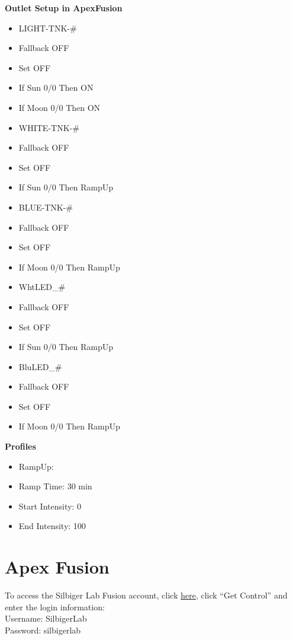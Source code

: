 \documentclass[]{book}
\providecommand{\tightlist}{%
  \setlength{\itemsep}{0pt}\setlength{\parskip}{0pt}}
\begin{document}
\textbf{Outlet Setup in ApexFusion}

\begin{itemize}
\tightlist
\item
  LIGHT-TNK-\#
\item
  Fallback OFF
\item
  Set OFF
\item
  If Sun 0/0 Then ON
\item
  If Moon 0/0 Then ON
\item
  WHITE-TNK-\#
\item
  Fallback OFF
\item
  Set OFF
\item
  If Sun 0/0 Then RampUp
\item
  BLUE-TNK-\#
\item
  Fallback OFF
\item
  Set OFF
\item
  If Moon 0/0 Then RampUp
\item
  WhtLED\_\#
\item
  Fallback OFF
\item
  Set OFF
\item
  If Sun 0/0 Then RampUp
\item
  BluLED\_\#
\item
  Fallback OFF
\item
  Set OFF
\item
  If Moon 0/0 Then RampUp
\end{itemize}

\textbf{Profiles}

\begin{itemize}
\tightlist
\item
  RampUp:
\item
  Ramp Time: 30 min
\item
  Start Intensity: 0
\item
  End Intensity: 100
\end{itemize}

\chapter{Apex Fusion}\label{apex-fusion}

To access the Silbiger Lab Fusion account, click
\href{https://github.com/SilbigerLab/Mesocosm_User_Manual/tree/7503b88686aef920c4a4ed473b1efe37b34dae10/Chapters/apexfusion.com}{here},
click ``Get Control'' and enter the login information:\\
Username: SilbigerLab\\
Password: silbigerlab
\end{document}
